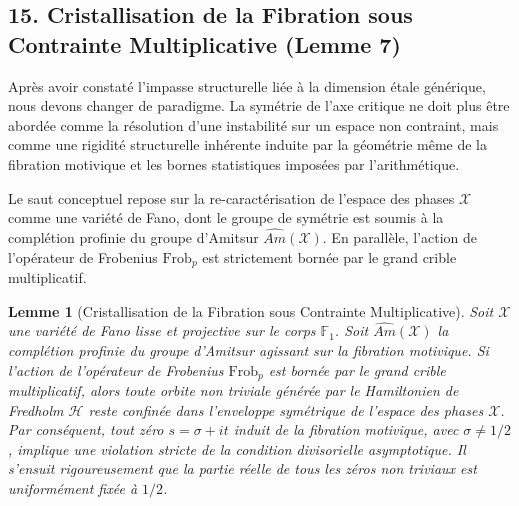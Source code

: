 \documentclass[
]{article}
\newtheorem{lemma}{Lemme}
\begin{document}
\subsection{15. Cristallisation de la Fibration sous Contrainte Multiplicative (Lemme 7)}
Après avoir constaté l'impasse structurelle liée à la dimension étale générique, nous devons changer de paradigme. La symétrie de l'axe critique ne doit plus être abordée comme la résolution d'une instabilité sur un espace non contraint, mais comme une rigidité structurelle inhérente induite par la géométrie même de la fibration motivique et les bornes statistiques imposées par l'arithmétique.

Le saut conceptuel repose sur la re-caractérisation de l'espace des phases $\mathcal{X}$ comme une variété de Fano, dont le groupe de symétrie est soumis à la complétion profinie du groupe d'Amitsur $\widehat{Am}(\mathcal{X})$. En parallèle, l'action de l'opérateur de Frobenius $\mathrm{Frob}_p$ est strictement bornée par le grand crible multiplicatif.

\begin{lemma}[Cristallisation de la Fibration sous Contrainte Multiplicative]
    Soit $\mathcal{X}$ une variété de Fano lisse et projective sur le corps $\mathbb{F}_1$. Soit $\widehat{Am}(\mathcal{X})$ la complétion profinie du groupe d'Amitsur agissant sur la fibration motivique. Si l'action de l'opérateur de Frobenius $\mathrm{Frob}_p$ est bornée par le grand crible multiplicatif, alors toute orbite non triviale générée par le Hamiltonien de Fredholm $\mathcal{H}$ reste confinée dans l'enveloppe symétrique de l'espace des phases $\mathcal{X}$. Par conséquent, tout zéro $s = \sigma + it$ induit de la fibration motivique, avec $\sigma \neq 1/2$, implique une violation stricte de la condition divisorielle asymptotique. Il s'ensuit rigoureusement que la partie réelle de tous les zéros non triviaux est uniformément fixée à $1/2$.
\end{lemma}
\end{document}
